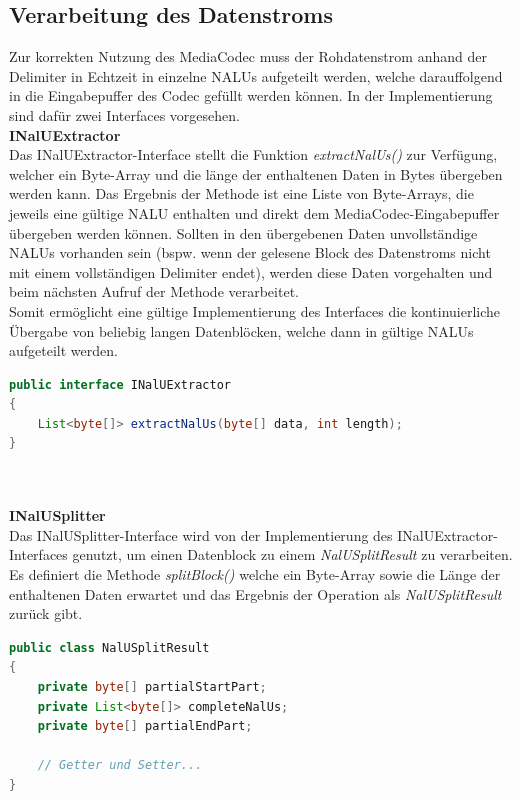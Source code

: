 \subsection{Verarbeitung des Datenstroms}
Zur korrekten Nutzung des MediaCodec muss der Rohdatenstrom anhand der Delimiter in Echtzeit in einzelne NALUs aufgeteilt werden, welche darauffolgend in die Eingabepuffer des Codec gefüllt werden können. In der Implementierung sind dafür zwei Interfaces vorgesehen.\\
\clearpage
\textbf{INalUExtractor}\\
Das INalUExtractor-Interface stellt die Funktion \textit{extractNalUs()} zur Verfügung, welcher ein Byte-Array und die länge der enthaltenen Daten in Bytes übergeben werden kann. Das Ergebnis der Methode ist eine Liste von Byte-Arrays, die jeweils eine gültige NALU enthalten und direkt dem MediaCodec-Eingabepuffer übergeben werden können. Sollten in den übergebenen Daten unvollständige NALUs vorhanden sein (bspw. wenn der gelesene Block des Datenstroms nicht mit einem vollständigen Delimiter endet), werden diese Daten vorgehalten und beim nächsten Aufruf der Methode verarbeitet.\\
Somit ermöglicht eine gültige Implementierung des Interfaces die kontinuierliche Übergabe von beliebig langen Datenblöcken, welche dann in gültige NALUs aufgeteilt werden.\\
\begin{lstlisting}[caption=Definition des INaluUExtractor-Interface, label=lst:i_nalu_extractor, language=Java]
public interface INalUExtractor
{
    List<byte[]> extractNalUs(byte[] data, int length);
}
\end{lstlisting}
~\\
\\
\textbf{INalUSplitter}\\
Das INalUSplitter-Interface wird von der Implementierung des INalUExtractor-Interfaces genutzt, um einen Datenblock zu einem \textit{NalUSplitResult} zu verarbeiten. Es definiert die Methode \textit{splitBlock()} welche ein Byte-Array sowie die Länge der enthaltenen Daten erwartet und das Ergebnis der Operation als \textit{NalUSplitResult} zurück gibt.

\begin{lstlisting}[caption=Definition der NalUSplitResult-Klasse, label=lst:nalu_split_result, language=Java]
public class NalUSplitResult
{
    private byte[] partialStartPart;
    private List<byte[]> completeNalUs;
    private byte[] partialEndPart;
    
    // Getter und Setter...
}
\end{lstlisting}

